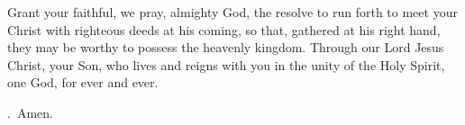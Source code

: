 \lettrine[lines=3]{G}{}rant your faithful, we pray, almighty God, the resolve to run forth to meet your Christ with righteous deeds at his coming, so that, gathered at his right hand, they may be worthy to possess the heavenly kingdom. Through our Lord Jesus Christ, your Son, who lives and reigns with you in the unity of the Holy Spirit, one God, for ever and ever. \par \Rbar.~Amen.
